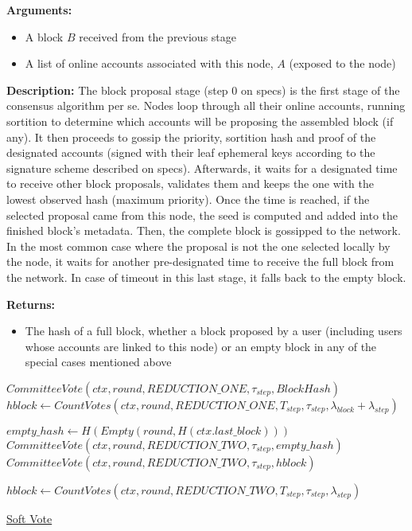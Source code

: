 \documentclass[10pt,a4paper]{article}
\begin{document}
\textbf{Arguments:}
\begin{itemize}
    \item A block $B$ received from the previous stage
    \item A list of online accounts associated with this node, $A$ (exposed to the node)
  \end{itemize}

\textbf{Description:}
The block proposal stage (step 0 on specs) is the first stage of the 
consensus algorithm per se. Nodes loop through all their online accounts, 
running sortition to determine which accounts will be proposing the 
assembled block (if any).
It then proceeds to gossip the priority, sortition hash and proof of 
the designated accounts (signed with their leaf ephemeral keys according 
to the signature scheme described on specs).
Afterwards, it waits for a designated time to receive other block proposals, 
validates them and keeps the one with the lowest observed hash (maximum 
priority).
Once the time is reached, if the selected proposal came from this node, 
the seed is computed and added into the finished block's metadata. 
Then, the complete block is gossipped to the network.
In the most common case where the proposal is not the one selected 
locally by the node, it waits for another pre-designated time to 
receive the full block from the network.
In case of timeout in this last stage, it falls back to the empty block.

\textbf{Returns:}
\begin{itemize}
    \item The hash of a full block, whether a block proposed by a user (including users whose accounts are 
    linked to this node) or an empty block in any of the special cases mentioned above
  \end{itemize}

\begin{algorithm}
    \begin{algorithmic}[H]
    
    \State $CommitteeVote(ctx, round, REDUCTION\_ONE, \tau_{step}, BlockHash)$
    \State $hblock \gets CountVotes(ctx, round, REDUCTION\_ONE, T_{step}, \tau_{step}, \lambda_{block} + \lambda_{step})$

    \State $empty\_hash \gets H(Empty(round, H(ctx.last\_block)))$ 
        \State $CommitteeVote(ctx, round, REDUCTION\_TWO, \tau_{step}, empty\_hash)$
    \Else
        {\State $CommitteeVote(ctx, round, REDUCTION\_TWO, \tau_{step}, hblock)$}
    \EndIf\

    \State $hblock \gets CountVotes(ctx, round, REDUCTION\_TWO, T_{step}, \tau_{step}, \lambda_{step})$ 


    \EndFunction
    \end{algorithmic}
    \caption{\underline{Soft Vote}}
\end{algorithm}
\end{document}
